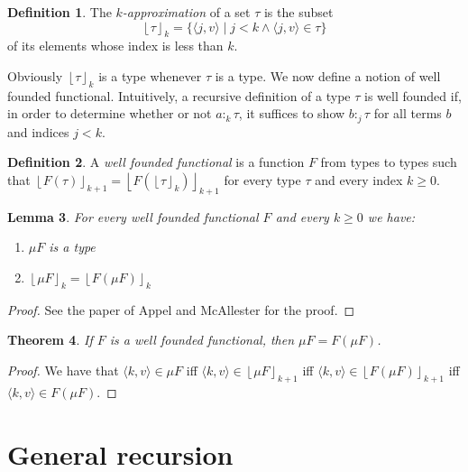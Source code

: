 \documentclass[10pt,a4paper,draft,twocolumn]{article}
\theoremstyle{definition}
\newtheorem{definition}{Definition}
\theoremstyle{plain}
\newtheorem{lemma}[definition]{Lemma}
\newtheorem{theorem}[definition]{Theorem}
\newcommand{\pair}[1]{\ensuremath{\langle{#1}\rangle}}
\newcommand{\floor}[1]{\ensuremath{\left\lfloor{#1}\right\rfloor}}
\begin{document}
\begin{definition} \label{def:Approximation}
  The \emph{$k$-approximation} of a set $\tau$ is the subset
  \[ \floor{\tau}_k = \{ \pair{j,v} \mid j < k \wedge \pair{j,v} \in \tau \} \]
  of its elements whose index is less than $k$.
\end{definition}

Obviously $\floor{\tau}_k$ is a type whenever $\tau$ is a type. We now define a notion of well founded
functional. Intuitively, a recursive definition of a type $\tau$ is well founded if, in order to determine
whether or not $a :_k \tau$, it suffices to show $b :_j \tau$ for all terms $b$ and indices $j < k$.

\begin{definition}
  A \emph{well founded functional} is a function $F$ from types to types such that
  $\floor{F\left(\tau\right)}_{k+1} = \floor{F\left(\floor{\tau}_k\right)}_{k+1}$
  for every type $\tau$ and every index $k \ge 0$.
\end{definition}

\begin{lemma}
  For every well founded functional $F$ and every $k \ge 0$ we have:
  \begin{enumerate}
  \item $\mu F$ is a type
  \item $\floor{\mu F}_k = \floor{F \left(\mu F\right)}_k$
  \end{enumerate}
\end{lemma}

\begin{proof}
  See the paper of Appel and McAllester \cite{Appel01} for the proof.
\end{proof}

\begin{theorem} \label{thm:Well_founded_fixpoint}
  If $F$ is a well founded functional, then $\mu F = F(\mu F)$.
\end{theorem}

\begin{proof}
  We have that $\pair{k,v} \in \mu F$ iff $\pair{k,v} \in \floor{\mu F}_{k+1}$
  iff $\pair{k,v} \in \floor{F \left(\mu F\right)}_{k+1}$ iff
  $\pair{k,v} \in F \left(\mu F\right)$.
\end{proof}


\section{General recursion}
\label{sec:General_recursion}
\end{document}
